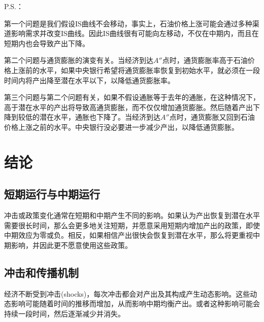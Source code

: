 \documentclass{article}
\begin{document}
\hspace*{\fill}

P.S.：

第一个问题是我们假设IS曲线不会移动，事实上，石油价格上涨可能会通过多种渠道影响需求并改变IS曲线。因此IS曲线很有可能向左移动，不仅在中期内，而且在短期内也会导致产出下降。

第二个问题与通货膨胀的演变有关。当经济到达$ A'' $点时，通货膨胀率高于石油价格上涨前的水平，如果中央银行希望将通货膨胀率恢复到初始水平，就必须在一段时间内将产出降至潜在水平以下，以降低通货膨胀率。

第三个问题与第二个问题有关，如果不假设通胀等于去年的通胀，在这种情况下，高于潜在水平的产出将导致高通货膨胀，而不仅仅增加通货膨胀。然后随着产出下降到较低的潜在水平，通胀也下降了。当经济到达$ A'' $点时，通货膨胀又回到石油价格上涨之前的水平。中央银行没必要进一步减少产出，以降低通货膨胀。

\section{结论}

\subsection{短期运行与中期运行}

冲击或政策变化通常在短期和中期产生不同的影响。如果认为产出恢复到潜在水平需要很长时间，那么会更多地关注短期，并愿意采用短期内增加产出的政策，即使中期效应为零或负。相反，如果相信产出很快会恢复到潜在水平，那么将更重视中期影响，并因此更不愿意使用这些政策。


\subsection{冲击和传播机制}

经济不断受到冲击(shocks)，每次冲击都会对产出及其构成产生动态影响。这些动态影响可能随着时间的推移而增加，从而影响中期均衡产出。或者这种影响可能会持续一段时间，然后逐渐减少并消失。













	
\end{document}
